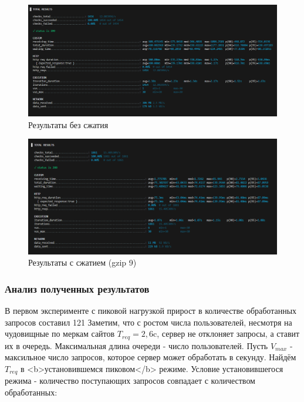 \documentclass[12pt]{article}
\begin{document}
\begin{figure}[H]
    \centering
    \includegraphics[width=1\textwidth]{../images/no-compress_exp2_k6screen.png}
    \caption{Результаты без сжатия}
\end{figure}

\begin{figure}[H]
    \centering
    \includegraphics[width=1\textwidth]{../images/gzip9_exp2_k6screen.png}
    \caption{Результаты с сжатием (gzip 9)}
\end{figure}

\subsubsection{Анализ полученных результатов }

В первом эксперименте с пиковой нагрузкой прирост в количестве обработанных запросов составил 121%
Заметим, что с ростом числа пользователей, несмотря на чудовищные по меркам сайтов $T_{req}=2,6$c, сервер не отклоняет запросы, а ставит их в очередь. Максимальная длина очереди - число пользователей. Пусть $V_{max}$ - максильное число запросов, которое сервер может обработать в секунду. Найдём $T_{req}$ в <b>установившемся пиковом</b> режиме. Условие установившегося режима - количество поступающих запросов совпадает с количеством обработанных:
\end{document}
